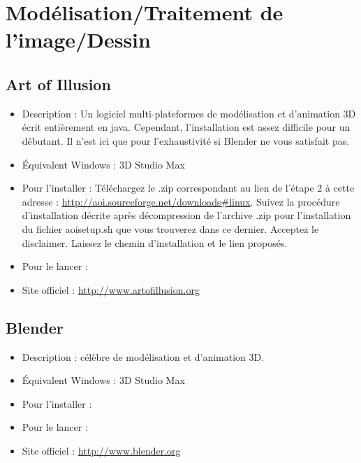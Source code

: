 \section{Modélisation/Traitement de l'image/Dessin}
\subsection{Art of Illusion}
\begin{itemize}
\begingroup
{}
\item Description : Un logiciel multi-plateformes de modélisation et d'animation 3D écrit entièrement en java. Cependant, l'installation est assez difficile pour un débutant. Il n'est ici que pour l'exhaustivité si Blender ne vous satisfait pas.{\par}
\item Équivalent Windows : 3D Studio Max{\par}
\endgroup
\item Pour l'installer : Téléchargez le .zip correspondant au lien de l'étape 2 à cette adresse : \url{http://aoi.sourceforge.net/downloads#linux}. Suivez la procédure d'installation décrite après décompression de l'archive .zip pour l'installation du fichier aoisetup.sh que vous trouverez dans ce dernier. Acceptez le disclaimer. Laissez le chemin d'installation et le lien proposés.{\par}
\item Pour le lancer : 
\item Site officiel : \url{http://www.artofillusion.org}{\par}
\end{itemize}
\subsection{Blender}
\begin{itemize}
\begingroup
{}
\item Description :  célèbre de modélisation et d'animation 3D.{\par}
\item Équivalent Windows : 3D Studio Max{\par}
\item Pour l'installer : 
\item Pour le lancer : 
\item Site officiel : \url{http://www.blender.org}{\par}
\endgroup
\end{itemize}
\newpage
